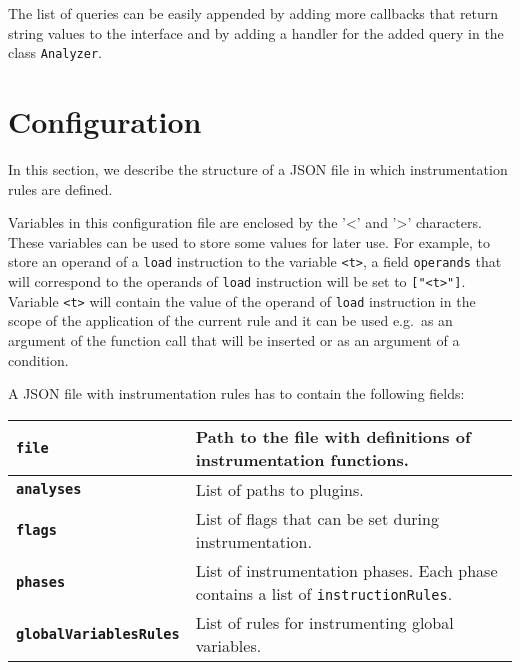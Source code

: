 The list of queries can be easily appended by adding more callbacks that return
string values to the interface and by adding a handler for the added query in the
class \texttt{Analyzer}.


\section{Configuration}\label{sec:config}

In this section, we describe the structure of a JSON file in which
instrumentation rules are defined.

Variables in this configuration file are enclosed by the '<' and '>'
characters. These variables can be used to store some values for later use. For
example, to store an operand of a \texttt{load} instruction to the variable
\texttt{<t>}, a field \texttt{operands} that will correspond to the operands of
\texttt{load} instruction will be set to \texttt{["<t>"]}.  Variable
\texttt{<t>} will contain the value of the operand of \texttt{load} instruction
in the scope of the application of the current rule and it can be used e.g.~as
an argument of the function call that will be inserted or as an argument
of a condition.

A JSON file with instrumentation rules has to contain the following fields:

\begin{center}
\begin{tabular}[h]{>{\bfseries}p{4.2cm} | p{7.8cm}}
  \texttt{file}                & Path to the file with definitions of instrumentation functions. \\
  \hline
  \texttt{analyses}            & List of paths to plugins. \\
  \hline
  \texttt{flags}               & List of flags that can be set during instrumentation. \\
  \hline
  \texttt{phases}              & List of instrumentation phases. Each phase contains a
                                 list of \texttt{instructionRules}. \\
  \hline
  \texttt{globalVariablesRules} & List of rules for instrumenting global
                                 variables.

\end{tabular}
\end{center}


